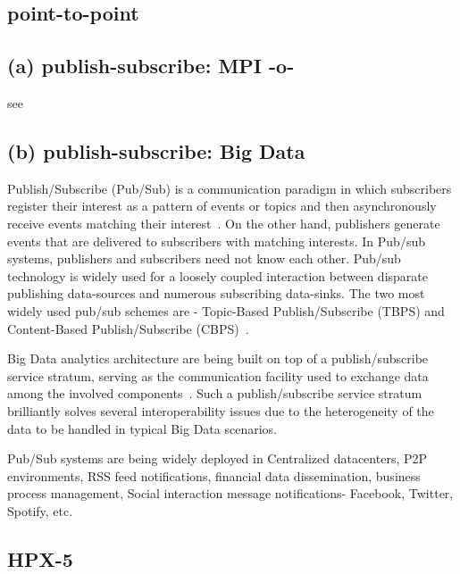 \subsection{point-to-point}
\subsection{ (a) publish-subscribe: MPI -o-}

     see 
     
\subsection{ (b) publish-subscribe: Big Data}

Publish/Subscribe (Pub/Sub) is a communication paradigm in which
subscribers register their interest as a pattern of events or topics
and then asynchronously receive events matching their
interest~\cite{thesis-pub-sub}.  On the other hand, publishers
generate events that are delivered to subscribers with matching
interests.  In Pub/sub systems, publishers and subscribers need not
know each other. Pub/sub technology is widely used for a loosely
coupled interaction between disparate publishing data-sources and
numerous subscribing data-sinks. The two most widely used pub/sub
schemes are - Topic-Based Publish/Subscribe (TBPS) and Content-Based
Publish/Subscribe (CBPS)~\cite{paper-pub-sub}.
      
Big Data analytics architecture are being built on top of a
publish/subscribe service stratum, serving as the communication
facility used to exchange data among the involved
components~\cite{paper-pub-sub-bigdata}. Such a publish/subscribe
service stratum brilliantly solves several interoperability issues due
to the heterogeneity of the data to be handled in typical Big Data
scenarios.

     Pub/Sub systems are being widely deployed in Centralized
     datacenters, P2P environments, RSS feed notifications, financial
     data dissemination, business process management, Social
     interaction message notifications- Facebook, Twitter, Spotify,
     etc.

     \pv

\subsection{HPX-5}

